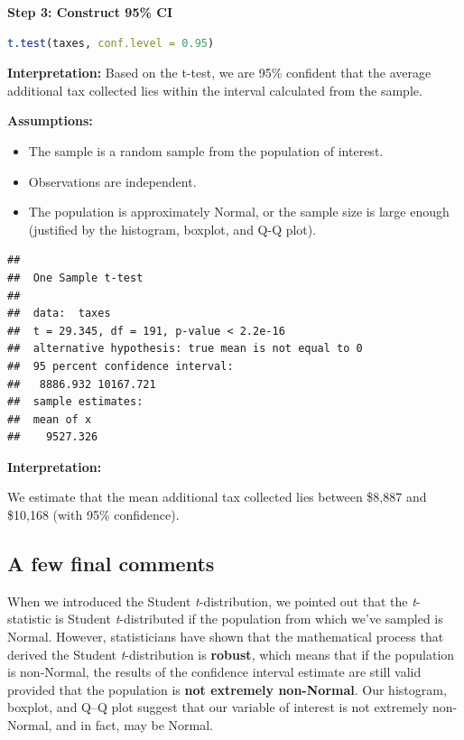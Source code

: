 \begin{example}
\vspace{1em}
\textbf{Step 3: Construct 95\% CI}

\begin{lstlisting}[language=R]
t.test(taxes, conf.level = 0.95)
\end{lstlisting}

\vspace{0.5em}
\textbf{Interpretation:} Based on the t-test, we are 95\% confident that the average additional tax collected lies within the interval calculated from the sample.

\textbf{Assumptions:}
\begin{itemize}
  \item The sample is a random sample from the population of interest.
  \item Observations are independent.
  \item The population is approximately Normal, or the sample size is large enough (justified by the histogram, boxplot, and Q-Q plot).
\end{itemize}

\begin{verbatim}
## 
##  One Sample t-test
## 
##  data:  taxes
##  t = 29.345, df = 191, p-value < 2.2e-16
##  alternative hypothesis: true mean is not equal to 0
##  95 percent confidence interval:
##   8886.932 10167.721
##  sample estimates:
##  mean of x 
##    9527.326 
\end{verbatim}

\bigskip

\textbf{Interpretation:}

We estimate that the mean additional tax collected lies between \$8,887 and \$10,168 (with 95\% confidence).
\end{example}
\subsection*{A few final comments}

When we introduced the Student \emph{t}-distribution, we pointed out that the \emph{t}-statistic is Student \emph{t}-distributed if the population from which we’ve sampled is Normal. However, statisticians have shown that the mathematical process that derived the Student \emph{t}-distribution is \textbf{robust}, which means that if the population is non-Normal, the results of the confidence interval estimate are still valid provided that the population is \textbf{not extremely non-Normal}. Our histogram, boxplot, and Q--Q plot suggest that our variable of interest is not extremely non-Normal, and in fact, may be Normal.


